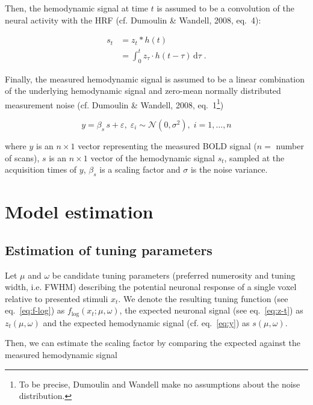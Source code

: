\documentclass[a4paper,12pt]{article}
\begin{document}
Then, the hemodynamic signal at time $t$ is assumed to be a convolution of the neural activity with the HRF (cf. Dumoulin \& Wandell, 2008, eq.~4):

\begin{equation} \label{eq:s-t}
\begin{split}
s_t &= z_t \ast h(t) \\
&= \int_{0}^{t} z_\tau \cdot h(t-\tau) \, \mathrm{d}\tau \; .
\end{split}
\end{equation}

Finally, the measured hemodynamic signal is assumed to be a linear combination of the underlying hemodynamic signal and zero-mean normally distributed measurement noise (cf. Dumoulin \& Wandell, 2008, eq.~1\footnote{To be precise, Dumoulin and Wandell make no assumptions about the noise distribution.})

\begin{equation} \label{eq:y}
y = \beta_s \, s + \varepsilon, \; \varepsilon_i \sim \mathcal{N}(0, \sigma^2), \; i = 1,\ldots,n
\end{equation}

where $y$ is an $n \times 1$ vector representing the measured BOLD signal ($n =$ number of scans), $s$ is an $n \times 1$ vector of the hemodynamic signal $s_t$, sampled at the acquisition times of $y$, $\beta_s$ is a scaling factor and $\sigma$ is the noise variance.


\section{Model estimation} \label{sec:Est}

\subsection{Estimation of tuning parameters}

Let $\mu$ and $\omega$ be candidate tuning parameters (preferred numerosity and tuning width, i.e. FWHM) describing the potential neuronal response of a single voxel relative to presented stimuli $x_t$. We denote the resulting tuning function (see eq.~\ref{eq:f-log}) as $f_\mathrm{log}(x_t; \mu, \omega)$, the expected neuronal signal (see eq.~\ref{eq:z-t}) as $z_t(\mu,\omega)$ and the expected hemodynamic signal (cf. eq.~\ref{eq:y}) as $s(\mu,\omega)$.

Then, we can estimate the scaling factor by comparing the expected against the measured hemodynamic signal
\end{document}
